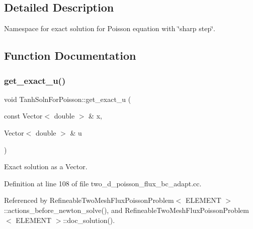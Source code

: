\subsection{Detailed Description}
Namespace for exact solution for Poisson equation with \char`\"{}sharp step\char`\"{}. 

\subsection{Function Documentation}
\mbox{\label{namespaceTanhSolnForPoisson_af7896e9c18ce6438c73ae2a875e8b7de}} 
\subsubsection{\texorpdfstring{get\+\_\+exact\+\_\+u()}{get\_exact\_u()}}
{\footnotesize\ttfamily void Tanh\+Soln\+For\+Poisson\+::get\+\_\+exact\+\_\+u (\begin{DoxyParamCaption}\item[{const Vector$<$ double $>$ \&}]{x,  }\item[{Vector$<$ double $>$ \&}]{u }\end{DoxyParamCaption})}



Exact solution as a Vector. 



Definition at line 108 of file two\+\_\+d\+\_\+poisson\+\_\+flux\+\_\+bc\+\_\+adapt.\+cc.



Referenced by Refineable\+Two\+Mesh\+Flux\+Poisson\+Problem$<$ E\+L\+E\+M\+E\+N\+T $>$\+::actions\+\_\+before\+\_\+newton\+\_\+solve(), and Refineable\+Two\+Mesh\+Flux\+Poisson\+Problem$<$ E\+L\+E\+M\+E\+N\+T $>$\+::doc\+\_\+solution().

\mbox{\label{namespaceTanhSolnForPoisson_a0e99ccf27df36f28f091de6d57484172}} 
